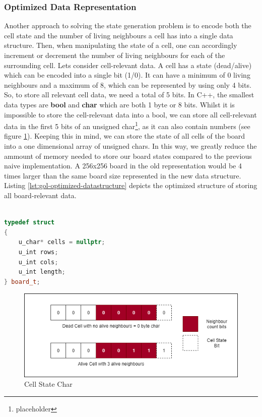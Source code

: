 \documentclass[a4paper,english,12pt,twoside=false]{scrartcl} %
\begin{document}
\subsubsection{Optimized Data Representation}

Another approach to solving the state generation problem is to encode both the cell state and the number of living neighbours a cell has into a single data structure. Then, when manipulating the state of a cell, one can accordingly increment or decrement the number of living neighbours for each of the surrounding cell. Lets consider cell-relevant data. A cell has a state (dead/alive) which can be encoded into a single bit (1/0). It can have a minimum of 0 living neighbours and a maximum of 8, which can be represented by using only 4 bits. So, to store all relevant cell data, we need a total of 5 bits. In C++, the smallest data types are \textbf{bool} and \textbf{char} which are both 1 byte or 8 bits. Whilst it is impossible to store the cell-relevant data into a bool, we can store all cell-relevant data in the first 5 bits of an unsigned char\footnote{placeholder}, as it can also contain numbers (see figure \ref{fig:cell-state}). Keeping this in mind, we can store the state of all cells of the board into a one dimensional array of unsigned chars. In this way, we greatly reduce the ammount of memory needed to store our board states compared to the previous naive implementation. A 256x256 board in the old representation would be 4 times larger than the same board size represented in the new data structure. Listing \ref{lst:gol-optimized-datastructure} depicts the optimized structure of storing all board-relevant data.

\pagebreak

\begin{lstlisting}[caption={Parallel Naive State Generation Algorithm},label={lst:gol-optimized-datastructure},language=C++]

typedef struct
{
    u_char* cells = nullptr;
    u_int rows;
    u_int cols;
    u_int length;
} board_t;

\end{lstlisting}

\begin{figure}[tbh!]
	\centering
	\includegraphics[width=16cm]{imgs/cell-state.png}
	\caption{Cell State Char}
	\label{fig:cell-state}
\end{figure}
\end{document}
